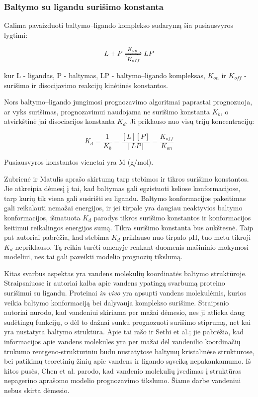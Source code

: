 \subsubsection{Baltymo su ligandu surišimo konstanta}

Galima pavaizduoti baltymo--ligando komplekso sudarymą šia pusiausvyros lygtimi:

\begin{equation}
L + P \xrightleftharpoons[K_{off}]{K_{on}} LP
\end{equation}

kur L - ligandas, P - baltymas, LP - baltymo--ligando kompleksas, $K_{on}$ ir $K_{off}$ - surišimo ir disocijavimo reakcijų kinėtinės konstantos.\cite{du_insights_2016}

Nors baltymo--ligando jungimosi prognozavimo algoritmai paprastai prognozuoja, ar vyks surišimas, prognozavimui naudojama ne surišimo konstanta $K_{b}$, o atvirkštinė jai disociacijos konstanta $K_{d}$. Ji priklauso nuo visų trijų koncentracijų:

\begin{equation}
K_{d} = \frac{1}{K_{b}} = \dfrac{[L][P]}{[LP]} = \frac{K_{off}}{K_{on}}
\end{equation}

Pusiausvyros konstantos vienetai yra M (g/mol).

Zubrienė ir Matulis \cite{matulis_carbonic_2019} aprašo skirtumą tarp stebimos ir tikros surišimo konstantos. Jie atkreipia dėmesį į tai, kad baltymas gali egzistuoti keliose konformacijose, tarp kurių tik viena gali susirišti su ligandu. Baltymo konformacijos pakeitimas gali reikalauti nemažai energijos, ir jei tirpale yra daugiau neaktyvios baltymo konformacijos, išmatuota $K_{d}$ parodys tikros surišimo konstantos ir konformacijos keitimui reikalingos energijos sumą. Tikra surišimo konstanta bus aukštesnė. Taip pat autoriai pabrėžia, kad stebima $K_{d}$ priklauso nuo tirpalo pH, tuo metu tikroji $K_{d}$ nepriklauso. Tą reikia turėti omenyje renkant duomenis mašininio mokymosi modeliui, nes tai gali paveikti modelio prognozių tikslumą.

Kitas svarbus aspektas yra vandens molekulių koordinatės baltymo struktūroje. Straipsniuose \cite{berry_practical_2015} ir \cite{schiebel_intriguing_2018}  autoriai kalba apie vandens ypatingą svarbumą proteino surišimui su ligandu. Proteinai \textit{in vivo} yra apsupti vandens molekulėmis, kurios veikia baltymo konformaciją bei dalyvauja komplekso surišime. Straipsnio autoriai nurodo, kad vandeniui skiriama per mažai dėmesio, nes ji atlieka daug sudėtingų funkcijų, o dėl to dažnai sunku prognozuoti surišimo stiprumą, net kai yra nustatyta baltymo struktūra. Apie tai rašo ir Sethi et al.\cite{sethi_molecular_2019}; jie pabrėžia, kad informacijos apie vandens molekules yra per mažai dėl vandenilio koordinačių trukumo rentgeno-struktūriniu būdu nustatytose baltymų kristalinėse struktūrose, bei patikimų teoretinių žinių apie vandens ir ligando sąveiką nepakankamumo. Iš kitos pusės, Chen et al.\cite{chen_hidden_2019} parodo, kad vandenio molekulių įvedimas į struktūras nepagerino aprašomo modelio prognozavimo tikslumo. Šiame darbe vandeniui nebus skirta dėmesio.

